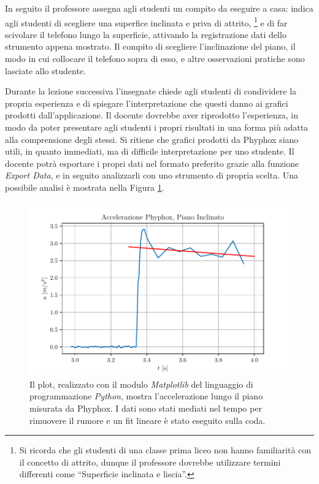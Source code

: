 \documentclass{report} \usepackage[T1]{fontenc} \usepackage[italian]{babel}
\begin{document}
In seguito il professore assegna agli studenti un compito da eseguire
a casa: indica agli studenti di scegliere una superfice inclinata
e priva di attrito,
\footnote{
          Si ricorda che gli studenti di una classe prima liceo
          non hanno familiarità con il concetto di attrito,
          dunque il professore dovrebbe utilizzare termini differenti
          come ``Superficie inclinata e liscia''.
         }
e di far scivolare il telefono lungo la superficie, attivando
la registrazione dati dello strumento appena mostrato.
Il compito di scegliere l'inclinazione del piano, il modo in cui
collocare il telefono sopra di esso, e altre osservazioni pratiche
sono lasciate allo studente.

Durante la lezione successiva l'insegnate chiede agli studenti
di condividere la propria esperienza e di spiegare l'interpretazione
che questi danno ai grafici prodotti dall'applicazione.
Il docente dovrebbe aver riprodotto l'esperienza, in modo
da poter presentare agli studenti i propri risultati in una
forma più adatta alla comprensione degli stessi.
Si ritiene che grafici prodotti da Phyphox siano utili,
in quanto immediati, ma di difficile interpretazione
per uno studente. Il docente potrà esportare i propri
dati nel formato preferito grazie alla funzione
\emph{Export Data}, e in seguito analizzarli con uno
strumento di propria scelta.
Una possibile analisi è mostrata nella Figura \ref{fig:a_phyphox}.


\begin{figure}[H]
\centering
  \includegraphics[width=\textwidth]{a_phyphox}
  \caption{Il plot, realizzato con il modulo \emph{Matplotlib}
           del linguaggio di programmazione \emph{Python},
           mostra l'accelerazione lungo il piano misurata da
           Phyphox. I dati sono stati mediati nel tempo
           per rimuovere il rumore e un fit lineare è stato
           eseguito sulla coda.
          }
  \label{fig:a_phyphox}
\end{figure}
\end{document}

